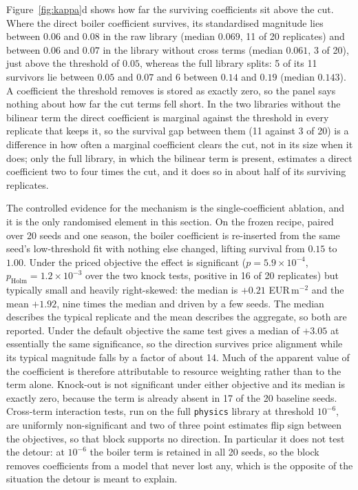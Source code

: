 Figure~\ref{fig:kappa}d shows how far the surviving coefficients sit above the cut. Where
the direct boiler coefficient survives, its standardised magnitude lies between $0.06$ and
$0.08$ in the raw library (median $0.069$, 11 of 20 replicates) and between $0.06$ and
$0.07$ in the library without cross terms (median $0.061$, 3 of 20), just above the
threshold of $0.05$, whereas the full library splits: 5 of its 11 survivors lie between
$0.05$ and $0.07$ and 6 between $0.14$ and $0.19$ (median $0.143$). A coefficient the
threshold removes is stored as exactly zero, so the panel says nothing about how far the
cut terms fell short. In the two libraries without the bilinear term the direct
coefficient is marginal against the threshold in every replicate that keeps it, so the
survival gap between them (11 against 3 of 20) is a difference in how often a marginal
coefficient clears the cut, not in its size when it does; only the full library, in which
the bilinear term is present, estimates a direct coefficient two to four times the cut,
and it does so in about half of its surviving replicates.

The controlled evidence for the mechanism is the single-coefficient ablation, and it is
the only randomised element in this section. On the frozen recipe, paired over 20 seeds
and one season, the boiler coefficient is re-inserted from the same seed's low-threshold
fit with nothing else changed, lifting survival from $0.15$ to $1.00$. Under the priced
objective the effect is significant ($p = 5.9\times10^{-4}$, $p_{\text{Holm}}=
1.2\times10^{-3}$ over the two knock tests, positive in 16 of 20 replicates) but typically
small and heavily right-skewed: the median is $+0.21$ EUR\,m$^{-2}$ and the mean $+1.92$,
nine times the median and driven by a few seeds. The median describes the typical
replicate and the mean describes the aggregate, so both are reported. Under
the default objective the same test gives a median of $+3.05$ at essentially the same
significance, so the direction survives price alignment while its typical magnitude falls
by a factor of about 14. Much of the apparent value of the coefficient is therefore
attributable to resource weighting rather than to the term alone. Knock-out is not
significant under either objective and its median is exactly zero, because the term is
already absent in 17 of the 20 baseline seeds. Cross-term
interaction tests, run on the full \texttt{physics} library at threshold $10^{-6}$, are
uniformly non-significant and two of three point estimates flip sign between the
objectives, so that block supports no direction. In particular it does not test the
detour: at $10^{-6}$ the boiler term is retained in all 20 seeds, so the block removes
coefficients from a model that never lost any, which is the opposite of the situation the
detour is meant to explain.

